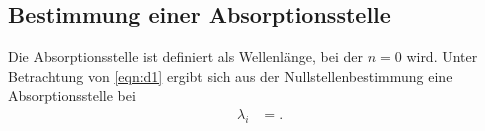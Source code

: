 \subsection{Bestimmung einer Absorptionsstelle}
Die Absorptionsstelle ist definiert als Wellenlänge, bei der $n=0$ wird.
Unter Betrachtung von \eqref{eqn:d1} ergibt sich aus der Nullstellenbestimmung eine Absorptionsstelle bei
\begin{align*}
  \lambda_i &= .\\
\end{align*}

